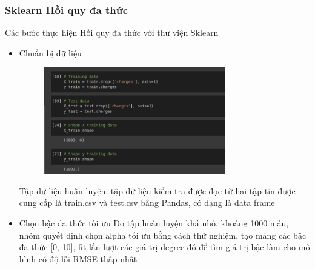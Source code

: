 \documentclass{article}
\begin{document}
	\subsubsection{Sklearn Hồi quy đa thức}
	Các bước thực hiện Hồi quy đa thức với thư viện Sklearn
	\begin{itemize}
		\item Chuẩn bị dữ liệu
		\begin{figure}[H]
			\centering
			\includegraphics[width=0.75\textwidth]{images/polynomial_reg/poly_data_preparation.png}
		\end{figure}
		Tập dữ liệu huấn luyện, tập dữ liệu kiểm tra được đọc từ hai tập tin được cung cấp là train.csv và test.csv bằng Pandas, có dạng là data frame
		\item Chọn bậc đa thức tối ưu
		Do tập huấn luyện khá nhỏ, khoảng 1000 mẫu, nhóm quyết định chọn alpha tối ưu bằng cách thử nghiệm, tạo mảng các bậc đa thức [0, 10], fit lần lượt các giá trị degree đó để tìm giá trị bậc làm cho mô hình có độ lỗi RMSE thấp nhất
		

\end{itemize}
\end{document}
